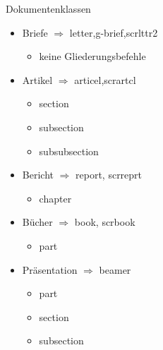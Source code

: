 \begin{frame}{Dokumentenklassen}
	\begin{itemize}[<+->]
		\item Briefe $ \Rightarrow $ letter,g-brief,scrlttr2
			\begin{itemize}[<+->]
				\item keine Gliederungsbefehle
			\end{itemize}
		\item Artikel $ \Rightarrow $ articel,scrartcl
			\begin{itemize}[<+->]
				\item section
				\item subsection
				\item subsubsection
			\end{itemize}
		\item Bericht $ \Rightarrow $ report, scrreprt
			\begin{itemize}[<+->]
				\item chapter
			\end{itemize}
		\item Bücher $ \Rightarrow $ book, scrbook
			\begin{itemize}[<+->]
				\item part
			\end{itemize}
		\item Präsentation $ \Rightarrow $ beamer
			\begin{itemize}[<+->]
				\item part
				\item section
				\item subsection
			\end{itemize}
	\end{itemize}
\end{frame}

